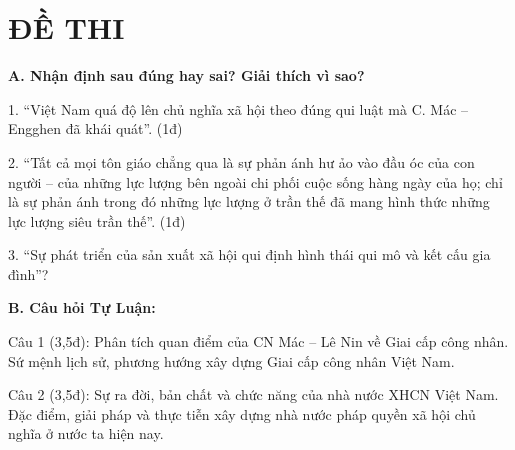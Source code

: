 \section*{ĐỀ THI}
\setcounter{section}{1}
\textbf{A. Nhận định sau đúng hay sai? Giải thích vì sao?}

1. “Việt Nam quá độ lên chủ nghĩa xã hội theo đúng qui luật mà C. Mác – Engghen đã khái quát”. (1đ)

2. “Tất cả mọi tôn giáo chẳng qua là sự phản ánh hư ảo vào đầu óc của con người – của những lực lượng bên ngoài chi phối cuộc sống hàng ngày của họ; chỉ là sự phản ánh trong đó những lực lượng ở trần thế đã mang hình thức những lực lượng siêu trần thế”. (1đ)

3. “Sự phát triển của sản xuất xã hội qui định hình thái qui mô và kết cấu gia đình”?

\textbf{B. Câu hỏi Tự Luận:}

Câu 1 (3,5đ): Phân tích quan điểm của CN Mác – Lê Nin về Giai cấp công nhân. 
Sứ mệnh lịch sử, phương hướng xây dựng Giai cấp công nhân Việt Nam.

Câu 2 (3,5đ): Sự ra đời, bản chất và chức năng của nhà nước XHCN Việt Nam. Đặc điểm, giải pháp và thực tiễn xây dựng nhà nước pháp quyền xã hội chủ nghĩa ở nước ta hiện nay.
\clearpage